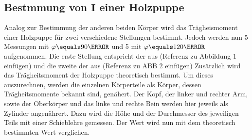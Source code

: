     \subsection{Bestmmung von $\symbf{I}$ einer Holzpuppe}
    Analog zur Bestimmung der anderen beiden Körper wird das Trägheismoment einer Holzpuppe für zwei verschiedene Stellungen bestimmt.
    Jedoch werden nun 5 Messungen mit $\varphi\equals90\degree$ und 5 mit $\varphi\equals120\degree$ aufgenommen.
    Die erste Stellung entspricht der aus (Referenz zu Abbildung 1 einfügen) und die zweite der aus (Referenz zu ABB 2 einfügen)
    Zusätzlich wird das Trägheitsmoment der Holzpuppe theoretisch bestimmt.
    Um dieses auszurechnen, werden die einzelnen Körperteile als Körper, dessen Trägheitsmomente bekannt sind, genähert.
    Der Kopf, der linker und rechter Arm, sowie der Oberkörper und das linke und rechte Bein werden hier jeweils als Zylinder angenährert.
    Dazu wird die Höhe und der Durchmesser des jeweiligen Teils mit einer Schieblehre gemessen.
    Der Wert wird nun mit dem theoretisch bestimmten Wert verglichen.
